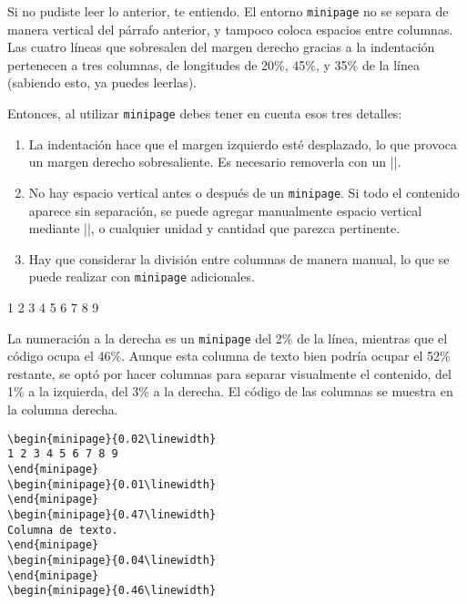 \vspace{10pt}
Si no pudiste leer lo anterior, te entiendo. El entorno \texttt{minipage} no se separa de manera vertical del párrafo anterior, y tampoco coloca espacios entre columnas. Las cuatro líneas que sobresalen del margen derecho gracias a la indentación pertenecen a tres columnas, de longitudes de 20\%, 45\%, y 35\% de la línea (sabiendo esto, ya puedes leerlas).

Entonces, al utilizar \texttt{minipage} debes tener en cuenta esos tres detalles:
\begin{enumerate}
	\item La indentación hace que el margen izquierdo esté desplazado, lo que provoca un margen derecho sobresaliente. Es necesario removerla con un |\noindent|.
	\item No hay espacio vertical antes o después de un \texttt{minipage}. Si todo el contenido aparece sin separación, se puede agregar manualmente espacio vertical mediante |\vspace{10pt}|, o cualquier unidad y cantidad que parezca pertinente.
	\item Hay que considerar la división entre columnas de manera manual, lo que se puede realizar con \texttt{minipage} adicionales.
\end{enumerate}

\vspace{-3mm}\lstrulet
\noindent\begin{minipage}{0.02\linewidth}
1 2 3 4 5 6 7 8 9
\end{minipage}
\begin{minipage}{0.01\linewidth}
\end{minipage}
\begin{minipage}{0.47\linewidth}
La numeración a la derecha es un \texttt{minipage} del 2\% de la línea, mientras que el código ocupa el 46\%. Aunque esta columna de texto bien podría ocupar el 52\% restante, se optó por hacer columnas para separar visualmente el contenido, del 1\% a la izquierda, del 3\% a la derecha. El código de las columnas se muestra en la columna derecha.
\end{minipage}
\begin{minipage}{0.04\linewidth}
\end{minipage}
\begin{minipage}{0.46\linewidth}
\begin{lstlisting}[style=latex,frame={}]
\begin{minipage}{0.02\linewidth}
1 2 3 4 5 6 7 8 9
\end{minipage}
\begin{minipage}{0.01\linewidth}
\end{minipage}
\begin{minipage}{0.47\linewidth}
Columna de texto.
\end{minipage}
\begin{minipage}{0.04\linewidth}
\end{minipage}
\begin{minipage}{0.46\linewidth}
\end{lstlisting}
\end{minipage}
\newline\lstruleb

